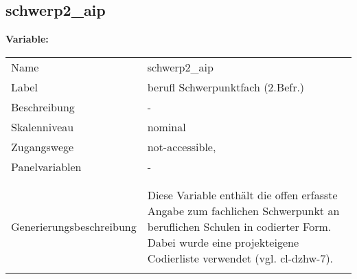 	
	
	\subsection{schwerp2\_aip}
	\label{subSection:schwerp2_aip}

	\noindent\textbf{Variable:}\\
		\begin{tabular}{lL{11.3cm}}
			\label{tableVariable:schwerp2_aip}
			Name & schwerp2\_aip \\
			Label & berufl Schwerpunktfach (2.Befr.) \\
			Beschreibung & - \\
			Skalenniveau & nominal \\
			Zugangswege &
				not-accessible,
 \\
			Panelvariablen & -
			 \\
			 \\
 \\
					Generierungsbeschreibung & Diese Variable enthält die offen erfasste Angabe zum fachlichen Schwerpunkt an beruflichen Schulen in codierter Form. Dabei wurde eine projekteigene Codierliste verwendet (vgl. cl-dzhw-7).
				 \\	
			 \\
		\end{tabular}






	
	\newpage
